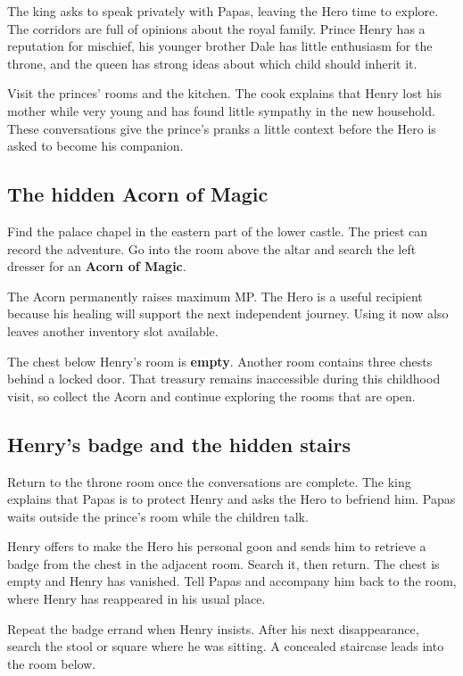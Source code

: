 The king asks to speak privately with Papas, leaving the Hero time to
explore. The corridors are full of opinions about the royal family.
Prince Henry has a reputation for mischief, his younger brother Dale
has little enthusiasm for the throne, and the queen has strong ideas
about which child should inherit it.

Visit the princes' rooms and the kitchen. The cook explains that Henry
lost his mother while very young and has found little sympathy in the
new household. These conversations give the prince's pranks a little
context before the Hero is asked to become his companion.

\subsection*{The hidden Acorn of Magic}

Find the palace chapel in the eastern part of the lower castle.
The priest can record the adventure. Go into the room above the altar
and search the left dresser for an \textbf{Acorn of Magic}.

The Acorn permanently raises maximum MP. The Hero is a useful recipient
because his healing will support the next independent journey. Using it
now also leaves another inventory slot available.

The chest below Henry's room is \textbf{empty}. Another room contains
three chests behind a locked door. That treasury remains inaccessible
during this childhood visit, so collect the Acorn and continue exploring
the rooms that are open.

\subsection*{Henry's badge and the hidden stairs}

Return to the throne room once the conversations are complete. The king
explains that Papas is to protect Henry and asks the Hero to befriend him.
Papas waits outside the prince's room while the children talk.

Henry offers to make the Hero his personal goon and sends him to retrieve
a badge from the chest in the adjacent room. Search it, then return.
The chest is empty and Henry has vanished. Tell Papas and accompany him
back to the room, where Henry has reappeared in his usual place.

Repeat the badge errand when Henry insists. After his next disappearance,
search the stool or square where he was sitting. A concealed staircase
leads into the room below.

